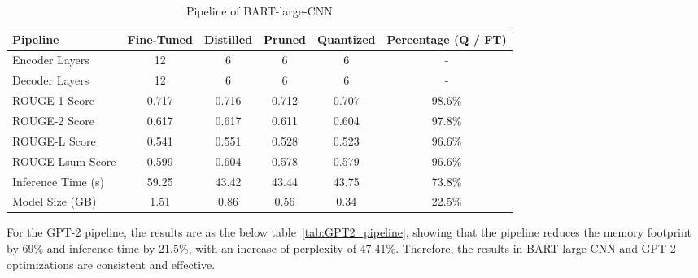 \begin{table*}[h!]
    \centering
    \begin{tabular}{lccccc}
        \toprule
        \textbf{Pipeline}       & \textbf{Fine-Tuned} & \textbf{Distilled} & \textbf{Pruned} & \textbf{Quantized}  & \textbf{Percentage (Q / FT)} \\ \midrule
        Encoder Layers        & 12                  & 6                     & 6                & 6  &  -                    \\
        Decoder Layers        & 12                  & 6                     & 6                & 6  &  -                    \\
        ROUGE-1 Score         & 0.717               & 0.716                 & 0.712            & 0.707  &  98.6\%                 \\
        ROUGE-2 Score         & 0.617               & 0.617                 & 0.611            & 0.604  &  97.8\%                \\
        ROUGE-L Score         & 0.541               & 0.551                 & 0.528            & 0.523  &  96.6\%                 \\
        ROUGE-Lsum Score      & 0.599               & 0.604                 & 0.578            & 0.579  &  96.6\%                 \\
        Inference Time (s)    & 59.25               & 43.42                 & 43.44             & 43.75  &  73.8\%                  \\
        Model Size (GB)       & 1.51                & 0.86                  & 0.56             & 0.34   &  22.5\%                  \\ \bottomrule
    \end{tabular}
    \caption{Pipeline of BART-large-CNN}
    \label{tab:BART_pipeline}
\end{table*}

For the GPT-2 pipeline, the results are as the below table~\ref{tab:GPT2_pipeline}, showing that the pipeline reduces the memory footprint by 69\% and inference time by 21.5\%, with an increase of perplexity of 47.41\%. Therefore, the results in BART-large-CNN and GPT-2 optimizations are consistent and effective.

